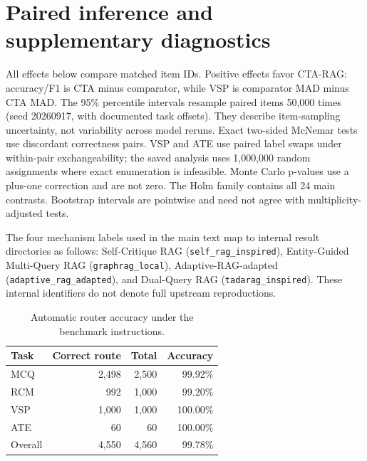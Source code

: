 \section{Paired inference and supplementary diagnostics}\label{app:paired-tests}

All effects below compare matched item IDs. Positive effects favor CTA-RAG: accuracy/F1 is CTA minus comparator, while VSP is comparator MAD minus CTA MAD. The 95\% percentile intervals resample paired items 50,000 times (seed 20260917, with documented task offsets). They describe item-sampling uncertainty, not variability across model reruns. Exact two-sided McNemar tests use discordant correctness pairs. VSP and ATE use paired label swaps under within-pair exchangeability; the saved analysis uses 1,000,000 random assignments where exact enumeration is infeasible. Monte Carlo p-values use a plus-one correction and are not zero. The Holm family contains all 24 main contrasts. Bootstrap intervals are pointwise and need not agree with multiplicity-adjusted tests.

The four mechanism labels used in the main text map to internal result directories as follows: Self-Critique RAG (\texttt{self\_rag\_inspired}), Entity-Guided Multi-Query RAG (\texttt{graphrag\_local}), Adaptive-RAG-adapted (\texttt{adaptive\_rag\_adapted}), and Dual-Query RAG (\texttt{tadarag\_inspired}). These internal identifiers do not denote full upstream reproductions.

\begin{table}[t]
\centering
\small
\caption{Automatic router accuracy under the benchmark instructions.}
\label{tab:router-appendix}
\begin{tabular}{@{}lrrr@{}}
\toprule
Task & Correct route & Total & Accuracy \\
\midrule
MCQ & 2,498 & 2,500 & 99.92\% \\
RCM & 992 & 1,000 & 99.20\% \\
VSP & 1,000 & 1,000 & 100.00\% \\
ATE & 60 & 60 & 100.00\% \\
Overall & 4,550 & 4,560 & 99.78\% \\
\bottomrule
\end{tabular}
\end{table}

